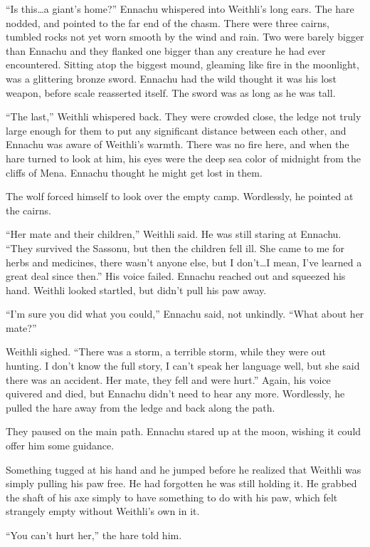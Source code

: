 ``Is this\ldots{}a giant's home?'' Ennachu whispered into Weithli's long ears. The hare nodded, and pointed to the far end of the chasm. There were three cairns, tumbled rocks not yet worn smooth by the wind and rain. Two were barely bigger than Ennachu and they flanked one bigger than any creature he had ever encountered. Sitting atop the biggest mound, gleaming like fire in the moonlight, was a glittering bronze sword. Ennachu had the wild thought it was his lost weapon, before scale reasserted itself. The sword was as long as he was tall.

``The last,'' Weithli whispered back. They were crowded close, the ledge not truly large enough for them to put any significant distance between each other, and Ennachu was aware of Weithli's warmth. There was no fire here, and when the hare turned to look at him, his eyes were the deep sea color of midnight from the cliffs of Mena. Ennachu thought he might get lost in them.

The wolf forced himself to look over the empty camp. Wordlessly, he pointed at the cairns.

``Her mate and their children,'' Weithli said. He was still staring at Ennachu. ``They survived the Sassonu, but then the children fell ill. She came to me for herbs and medicines, there wasn't anyone else, but I don't\ldots{}I mean, I've learned a great deal since then.'' His voice failed. Ennachu reached out and squeezed his hand. Weithli looked startled, but didn't pull his paw away.

``I'm sure you did what you could,'' Ennachu said, not unkindly. ``What about her mate?''

Weithli sighed. ``There was a storm, a terrible storm, while they were out hunting. I don't know the full story, I can't speak her language well, but she said there was an accident. Her mate, they fell and were hurt.'' Again, his voice quivered and died, but Ennachu didn't need to hear any more. Wordlessly, he pulled the hare away from the ledge and back along the path.

They paused on the main path. Ennachu stared up at the moon, wishing it could offer him some guidance.

Something tugged at his hand and he jumped before he realized that Weithli was simply pulling his paw free. He had forgotten he was still holding it. He grabbed the shaft of his axe simply to have something to do with his paw, which felt strangely empty without Weithli's own in it.

``You can't hurt her,'' the hare told him.

